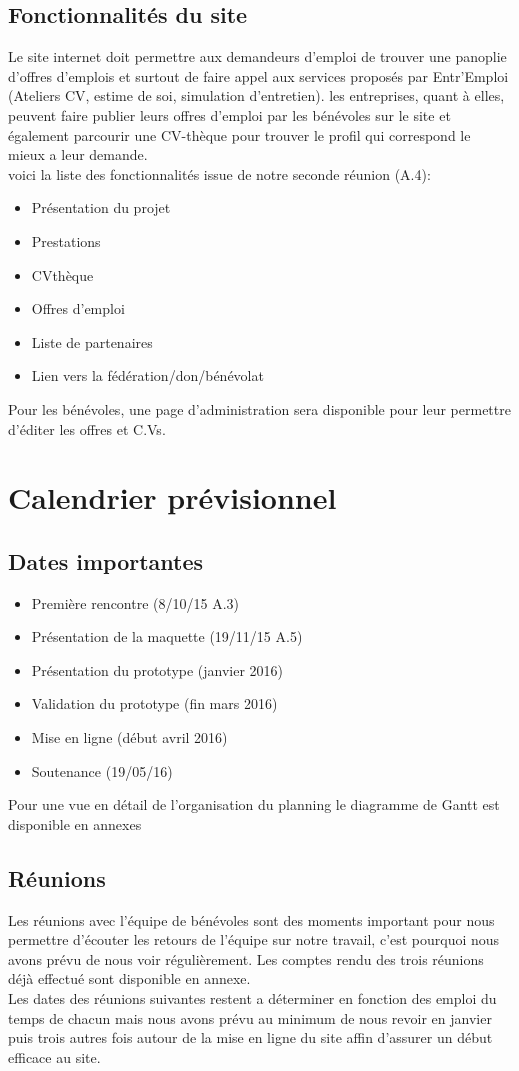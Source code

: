 \documentclass[a4paper, 12pt]{report}
\begin{document}
\section{Fonctionnalités du site}
Le site internet doit permettre aux demandeurs d'emploi de trouver une panoplie d'offres d'emplois et surtout de faire
appel aux services proposés par Entr'Emploi (Ateliers CV, estime de soi, simulation d'entretien).
les entreprises, quant à elles, peuvent faire publier leurs offres d'emploi par les bénévoles sur le site et également
parcourir une CV-thèque pour trouver le profil qui correspond le mieux a leur demande.\\
voici la liste des fonctionnalités issue de notre seconde réunion (A.4):
\begin{itemize}
    \item Présentation du projet
    \item Prestations
    \item CVthèque
    \item Offres d'emploi
    \item Liste de partenaires
    \item Lien vers la fédération/don/bénévolat
\end{itemize}
Pour les bénévoles, une page d'administration sera disponible pour leur permettre d'éditer les offres et C.Vs.

\chapter{Calendrier prévisionnel}
\thispagestyle{fancy}
\section{Dates importantes}
\begin{itemize}
\item Première rencontre (8/10/15 A.3)
\item Présentation de la maquette (19/11/15 A.5)
\item Présentation du prototype (janvier 2016)
\item Validation du prototype (fin mars 2016)
\item Mise en ligne (début avril 2016)
\item Soutenance (19/05/16)
\end{itemize}
Pour une vue en détail de l'organisation du planning le diagramme de Gantt est disponible en annexes
\section{Réunions}
Les réunions avec l'équipe de bénévoles sont des moments important pour nous permettre d'écouter les retours de l'équipe sur notre travail, c'est pourquoi nous avons prévu de nous voir régulièrement. Les comptes rendu des trois réunions déjà effectué sont disponible en annexe.\\
Les dates des réunions suivantes restent a déterminer en fonction des emploi du temps de chacun mais nous avons prévu au minimum de nous revoir en janvier puis trois autres fois autour de la mise en ligne du site affin d'assurer un début efficace au site.
\end{document}
